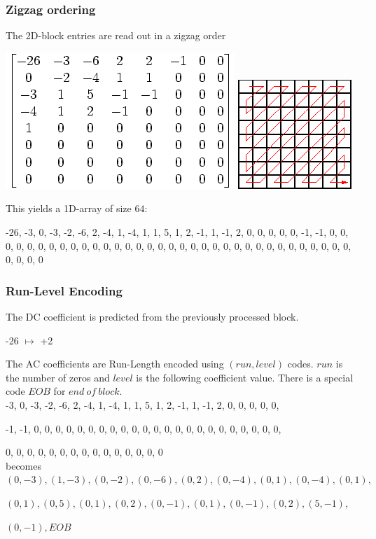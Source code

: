 \documentclass{beamer}
\begin{document}
\begin{frame}
\frametitle{Zigzag ordering}
The 2D-block entries are read out in a zigzag order

\begin{center}
\includegraphics[height=0.25\textwidth]{quantized-matrix}\quad
\includegraphics[height=0.25\textwidth]{zigzag}
\end{center}
%
This yields a 1D-array of size $64$:
%

-26, -3, 0, -3, -2, -6, 2, -4, 1, -4, 1, 1, 5, 1, 2, -1, 1, -1,
2, 0, 0, 0, 0, 0, -1, -1, 0, 0, 0, 0, 0, 0, 0, 0, 0, 0, 0, 0, 0, 0, 0, 0,
0, 0, 0, 0, 0, 0, 0, 0, 0, 0, 0, 0, 0, 0, 0, 0, 0, 0, 0, 0, 0, 0


\end{frame}

\begin{frame}
\frametitle{Run-Level Encoding}
The DC coefficient is predicted from the previously processed block.

\begin{center}
-26 $\mapsto$ +2
\end{center}

The AC coefficients are Run-Length encoded using $(\mathit{run},\mathit{level})$ codes.
$\mathit{run}$ is the number of zeros and $\mathit{level}$ is the following  
coefficient value. There is a special code $EOB$ for $\mathit{end\ of\ block}$.\\[12pt]

-3, 0, -3, -2, -6, 2, -4, 1, -4, 1, 1, 5, 1, 2, -1, 1, -1, 2, 0, 0, 0, 0, 0, 

-1, -1, 0, 0, 0, 0, 0, 0, 0, 0, 0, 0, 0, 0, 0, 0, 0, 0, 0, 0, 0, 0, 0, 0, 0, 

0, 0, 0, 0, 0, 0, 0, 0, 0, 0, 0, 0, 0, 0, 0\\[6pt]

becomes\\[6pt]

$(0,-3), (1,-3), (0,-2), (0,-6), (0,2), (0,-4), (0,1), (0,-4), (0,1), $

$(0,1), (0,5), (0,1), (0,2), (0,-1), (0,1), (0,-1), (0,2), (5,-1), $

$(0,-1), EOB$

\end{frame}
\end{document}
